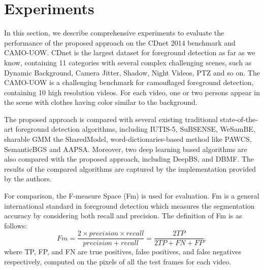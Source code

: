 \documentclass[journal]{IEEEtran}
\begin{document}
\section{Experiments}
\label{sec5}
In this section, we describe comprehensive experiments to evaluate the performance of the proposed approach on the CDnet 2014 benchmark\cite{CDN2014} and CAMO-UOW\cite{CAMO}.
%
CDnet is the largest dataset for foreground detection as far as we know, containing 11 categories with several complex challenging scenes, such as Dynamic Background, Camera Jitter, Shadow, Night Videos, PTZ and so on. 
The CAMO-UOW is a challenging benchmark for camouflaged foreground detection, containing 10 high resolution videos. 
For each video, one or two persons appear in the scene with clothes having color similar to the background.

The proposed approach is compared with several existing traditional state-of-the-art foreground detection algorithms, including IUTIS-5\cite{Bianco2017TEC}, SuBSENSE\cite{St-Charles2015SuBSENSE}, WeSamBE\cite{Jiang2017WeSamBE}, sharable GMM the SharedModel\cite{Chen2015SharedModel}, word-dictionaries-based method like PAWCS\cite{Charles2015PAWCS}, SemanticBGS\cite{Braham2017Semantic} and AAPSA\cite{RAMIREZALONSO2016990}.
Moreover, two deep learning based algorithms are also compared with the proposed approach, including DeepBS\cite{Babaee2017deep}, and DBMF\cite{Yang2018DBMF}. 
The results of the compared algorithms are captured by the implementation provided by the authors.

For comparison, the F-measure Space (Fm) is used for evaluation. 
Fm is a general international standard in foreground detection which measures the segmentation accuracy by considering both recall and precision. 
The definition of Fm is as follows:
\begin{equation}
Fm= \frac{2\times precision \times recall}{precision + recall} = \frac{2TP}{2TP+FN+FP},
\end{equation}
% 
% 
%
where TP, FP, and FN are true positives, false positives, and false negatives respectively, computed on the pixels of all the test frames for each video. 
\end{document}
